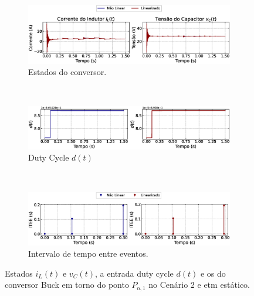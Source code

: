 \begin{figure}[H]
  \centering
  \captionsetup{justification=centering}
  \begin{subfigure}{1.\textwidth}
    \centering
    \includegraphics[width=1.\textwidth]{figuras/static-etm/buck/sim2/op1/result.eps}
    \caption{Estados do conversor.}
    \label{fig:buck_converter_variable_pcpl_static_etm_op1_duty_a}
  \end{subfigure}
  \\[6pt]
  \begin{subfigure}{1.\textwidth}
    \centering
    \includegraphics[width=1.\textwidth]{figuras/static-etm/buck/sim2/op1/duty-cycle.eps}
    \caption{Duty Cycle $d(t)$}
    \label{fig:buck_converter_variable_pcpl_static_etm_op1_duty_b}
  \end{subfigure}
  \\[6pt]
  \begin{subfigure}{1.\textwidth}
    \centering
    \includegraphics[width=1.\textwidth]{figuras/static-etm/buck/sim2/op1/inter-event-times.eps}
    \caption{Intervalo de tempo entre eventos.}
    \label{fig:buck_converter_variable_pcpl_static_etm_op1_duty_c}
  \end{subfigure}
  \caption{Estados $i_L(t)$ e $v_C(t)$, a entrada duty cycle $d(t)$ e os  do conversor Buck em torno do ponto $P_{\mathrm{o}, 1}$ no Cenário 2 e \acrshort{etm} estático.}
\end{figure}

